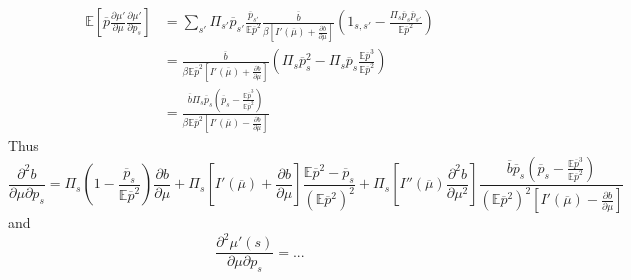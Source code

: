 \documentclass[12pt]{article}
\newcommand{\EE}{\mathbb E}
\newcommand{\pbar}{{\overline p}}
\newcommand{\bbar}{{\overline b}}
\newcommand{\mubar}{{\overline \mu}}
\begin{document}
\[
\begin{split}
	\EE\left[\pbar\frac{\partial\mu'}{\partial\mu}\frac{\partial \mu'}{\partial p_s}\right]
	&=\sum_{s'}\Pi_{s'}\pbar_{s'}\frac{\pbar_{s'}}{\EE\pbar^2}\frac{\bbar}{\beta\left[I'(\mubar)+\frac{\partial b}{\partial\mu}\right]}\left(1_{s,s'}-\frac{\Pi_s\pbar_s\pbar_{s'}}{\EE\pbar^2}\right)\\
	&=\frac{\bbar}{\beta\EE\pbar^2\left[I'(\mubar)+\frac{\partial b}{\partial \mu}\right]}\left(\Pi_s\pbar_s^2-\Pi_s\pbar_s\frac{\EE\pbar^3}{\EE\pbar^2}\right)\\
	&=\frac{\bbar\Pi_s\pbar_s\left(\pbar_s -\frac{\EE\pbar^3}{\EE\pbar^2}\right)}{\beta\EE\pbar^2\left[I'(\mubar)-\frac{\partial b}{\partial\mu}\right]}
\end{split}
\]Thus 
\begin{equation}
	\frac{\partial^2 b}{\partial \mu\partial p_s} = \Pi_s\left(1-\frac{\pbar_s}{\EE\pbar^2}\right)\frac{\partial b}{\partial \mu} + \Pi_s\left[I'(\mubar)+\frac{\partial b}{\partial \mu}\right]\frac{\EE\pbar^2-\pbar_s}{(\EE\pbar^2)^2}+\Pi_s\left[I''(\mubar)\frac{\partial^2b}{\partial\mu^2}\right]\frac{\bbar\pbar_s\left(\pbar_s-\frac{\EE\pbar^3}{\EE\pbar^2}\right)}{(\EE\pbar^2)^2\left[I'(\mubar)-\frac{\partial b}{\partial\mu}\right]}
\end{equation}and 
\begin{equation}
	\frac{\partial^2\mu'(s)}{\partial\mu\partial p_s}= ...
\end{equation}
\end{document}
